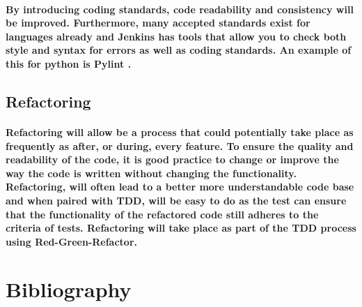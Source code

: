 \documentclass{article}
\begin{document}
\paragraph{By introducing coding standards, code readability and consistency will be improved. Furthermore, many accepted standards exist for languages already and Jenkins has tools that allow you to check both style and syntax for errors as well as coding standards. An example of this for python is Pylint \cite{pylint}.
}

\subsection{Refactoring}
\paragraph{Refactoring will allow be a process that could potentially take place as frequently as after, or during, every feature. To ensure the quality and readability of the code, it is good practice to change or improve the way the code is written without changing the functionality. Refactoring, will often lead to a better more understandable code base and when paired with TDD, will be easy to do as the test can ensure that the functionality of the refactored code still adheres to the criteria of tests. Refactoring will take place as part of the TDD process using Red-Green-Refactor.}


\nocite{*} %

\newpage


\section{Bibliography}
\end{document}
